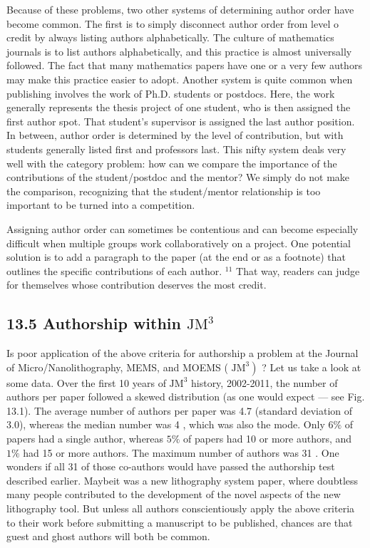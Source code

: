 Because of these problems, two other systems of determining author order have become common. The first is to simply disconnect author order from level o credit by always listing authors alphabetically. The culture of mathematics journals is to list authors alphabetically, and this practice is almost universally followed. The fact that many mathematics papers have one or a very few authors may make this practice easier to adopt. Another system is quite common when publishing involves the work of Ph.D. students or postdocs. Here, the work generally represents the thesis project of one student, who is then assigned the first author spot. That student's supervisor is assigned the last author position. In between, author order is determined by the level of contribution, but with students generally listed first and professors last. This nifty system deals very well with the category problem: how can we compare the importance of the contributions of the student/postdoc and the mentor? We simply do not make the comparison, recognizing that the student/mentor relationship is too important to be turned into a competition.

Assigning author order can sometimes be contentious and can become especially difficult when multiple groups work collaboratively on a project. One potential solution is to add a paragraph to the paper (at the end or as a footnote) that outlines the specific contributions of each author. ${ }^{11}$ That way, readers can judge for themselves whose contribution deserves the most credit.

\subsection*{13.5 Authorship within $\mathrm{JM}^{3}$}
Is poor application of the above criteria for authorship a problem at the Journal of Micro/Nanolithography, MEMS, and MOEMS ( $\left.\mathrm{JM}^{3}\right)$ ? Let us take a look at some data. Over the first 10 years of $\mathrm{JM}^{3}$ history, 2002-2011, the number of authors per paper followed a skewed distribution (as one would expect — see Fig. 13.1). The average number of authors per paper was 4.7 (standard deviation of 3.0), whereas the median number was 4 , which was also the mode. Only $6 \%$ of papers had a single author, whereas $5 \%$ of papers had 10 or more authors, and $1 \%$ had 15 or more authors. The maximum number of authors was 31 . One wonders if all 31 of those co-authors would have passed the authorship test described earlier. Maybeit was a new lithography system paper, where doubtless many people contributed to the development of the novel aspects of the new lithography tool. But unless all authors conscientiously apply the above criteria to their work before submitting a manuscript to be published, chances are that guest and ghost authors will both be common.

